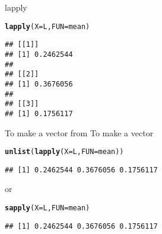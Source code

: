 \documentclass[aspectratio=169]{beamer}\usepackage[]{graphicx}\usepackage[]{xcolor}
\makeatletter
\newcommand{\hldef}[1]{\textcolor[rgb]{0.345,0.345,0.345}{#1}}%
\newcommand{\hlkwc}[1]{\textcolor[rgb]{0.333,0.667,0.333}{#1}}%
\newcommand{\hlkwd}[1]{\textcolor[rgb]{0.737,0.353,0.396}{\textbf{#1}}}%
\newenvironment{kframe}{%
 \def\at@end@of@kframe{}%
 \ifinner\ifhmode%
  \def\at@end@of@kframe{\end{minipage}}%
  \begin{minipage}{\columnwidth}%
 \fi\fi%
 \def\FrameCommand##1{\hskip\@totalleftmargin \hskip-\fboxsep
 \colorbox{shadecolor}{##1}\hskip-\fboxsep
     \hskip-\linewidth \hskip-\@totalleftmargin \hskip\columnwidth}%
 \MakeFramed {\advance\hsize-\width
   \@totalleftmargin\z@ \linewidth\hsize
   \@setminipage}}%
 {\par\unskip\endMakeFramed%
 \at@end@of@kframe}
\newenvironment{knitrout}{}{} %
\makeatother
\begin{document}
\begin{frame}[fragile]{lapply}
\begin{knitrout}
\color{fgcolor}\begin{kframe}
\begin{alltt}
\hlkwd{lapply}\hldef{(}\hlkwc{X} \hldef{= L,} \hlkwc{FUN} \hldef{= mean)}
\end{alltt}
\begin{verbatim}
## [[1]]
## [1] 0.2462544
## 
## [[2]]
## [1] 0.3676056
## 
## [[3]]
## [1] 0.1756117
\end{verbatim}
\end{kframe}
\end{knitrout}
\end{frame}

\begin{frame}[fragile]{To make a vector from }
To make a vector
\begin{knitrout}
\color{fgcolor}\begin{kframe}
\begin{alltt}
\hlkwd{unlist}\hldef{(}\hlkwd{lapply}\hldef{(}\hlkwc{X} \hldef{= L,} \hlkwc{FUN} \hldef{= mean))}
\end{alltt}
\begin{verbatim}
## [1] 0.2462544 0.3676056 0.1756117
\end{verbatim}
\end{kframe}
\end{knitrout}
or
\begin{knitrout}
\color{fgcolor}\begin{kframe}
\begin{alltt}
\hlkwd{sapply}\hldef{(}\hlkwc{X} \hldef{= L,} \hlkwc{FUN} \hldef{= mean)}
\end{alltt}
\begin{verbatim}
## [1] 0.2462544 0.3676056 0.1756117
\end{verbatim}
\end{kframe}
\end{knitrout}
\end{frame} 
\end{document}
